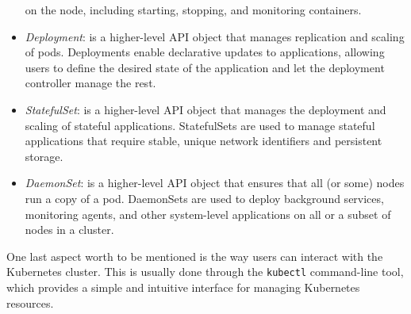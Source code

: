 \begin{itemize}
    on the node, including starting, stopping, and monitoring containers.
  \item \textit{Deployment}: is a higher-level API object that manages
    replication and scaling of pods. Deployments enable declarative updates to
    applications, allowing users to define the desired state of the application
    and let the deployment controller manage the rest.
  \item \textit{StatefulSet}: is a higher-level API object that manages the
    deployment and scaling of stateful applications. StatefulSets are used to
    manage stateful applications that require stable, unique network identifiers
    and persistent storage.
  \item \textit{DaemonSet}: is a higher-level API object that ensures that all
    (or some) nodes run a copy of a pod. DaemonSets are used to deploy
    background services, monitoring agents, and other system-level applications
    on all or a subset of nodes in a cluster.
\end{itemize}

One last aspect worth to be mentioned is the way users can interact with the
Kubernetes cluster.
This is usually done through the \texttt{kubectl} command-line tool, which
provides a simple and intuitive interface for managing Kubernetes resources.
